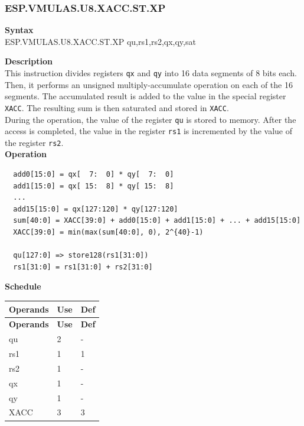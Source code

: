 \newpage
\subsubsection{ESP.VMULAS.U8.XACC.ST.XP}\label{instruction:ESPVMULASU8XACCSTXP}
\textbf{Syntax}\\
ESP.VMULAS.U8.XACC.ST.XP qu,rs1,rs2,qx,qy,sat

\textbf{Description}\\

This instruction divides registers \lstinline{qx} and \lstinline{qy} into 16 data segments of 8 bits each. Then, it performs an unsigned multiply-accumulate operation on each of the 16 segments. The accumulated result is added to the value in the special register \lstinline{XACC}. The resulting sum is then saturated and stored in \lstinline{XACC}. \\ During the operation, the value of the register \lstinline{qu} is stored to memory. After the access is completed, the value in the register \lstinline{rs1} is incremented by the value of the register \lstinline{rs2}.\\
\textbf{Operation}
\begin{lstlisting}
  add0[15:0] = qx[  7:  0] * qy[  7:  0]
  add1[15:0] = qx[ 15:  8] * qy[ 15:  8]
  ...
  add15[15:0] = qx[127:120] * qy[127:120]
  sum[40:0] = XACC[39:0] + add0[15:0] + add1[15:0] + ... + add15[15:0]
  XACC[39:0] = min(max(sum[40:0], 0), 2^{40}-1)

  qu[127:0] => store128(rs1[31:0])
  rs1[31:0] = rs1[31:0] + rs2[31:0]
\end{lstlisting}

\textbf{Schedule}\\
\begin{longtable}[c]{|l|l|l|}
    \hline
    \rowcolor{lightgray}
    \textbf{Operands} & \textbf{Use} & \textbf{Def} \\\hline
    \endfirsthead
    \hline
    \rowcolor{lightgray}
     \textbf{Operands} & \textbf{Use} & \textbf{Def} \\\hline
    \endhead
    \hline
    \endfoot

    qu & 2 & - \\\hline
    rs1 & 1 & 1 \\\hline
    rs2 & 1 & - \\\hline
     qx & 1 & - \\\hline
     qy & 1 & - \\\hline
     XACC & 3 & 3

\end{longtable}

